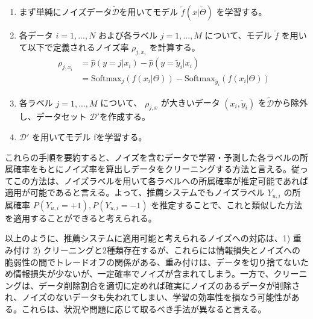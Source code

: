 \documentclass[11pt,a4paper]{article}
\begin{document}
\begin{enumerate}
    \item まず単純にノイズデータ$\tilde{\mathcal{D}}$を用いてモデル $\tilde{f}(x|\tilde{\Theta})$ を学習する。
    \item 各データ $i=1,...,N$ および各ラベル $j=1,...,M$ について、モデル $\tilde{f}$ を用いて以下で定義されるノイズ率 $\rho_{j,x_{i}}$ を計算する。
    \begin{align}
        \rho_{j,x_{i}}&=\hat{p}(y=j|x_{i})-\hat{p}(y=\tilde{y}_{i}|x_{i}) \label{eq:2.6} \\
        &= \text{Softmax}_{j}(f(x_{i}|\Theta))-\text{Softmax}_{\tilde{y}_{i}}(f(x_{i}|\Theta)) \label{eq:2.7}
    \end{align}
    \item 各ラベル $j=1,...,M$ について、 $\rho_{j,x}$ が大きいデータ $(x_{i},\tilde{y}_{i})$ を$\tilde{\mathcal{D}}$から除外し、データセット $\mathcal{D}'$を作成する。
    \item $\mathcal{D}'$ を用いてモデル fを学習する。
\end{enumerate}
これらの手順を要約すると、ノイズを含むデータで学習・予測した各ラベルの所属確率をもとにノイズ率を算出しデータをクリーニングする方法と言える。従ってこの方法は、ノイズラベルを用いて各ラベルへの所属確率が推定可能であれば適用が可能であると言える。よって、推薦システムでもノイズラベル $Y_{u,i}$ の所属確率 $P(Y_{u,i}=+1),P(Y_{u,i}=-1)$ を推定することで、これと類似した方法を適用することができると考えられる。

以上のように、推薦システムに適用可能と考えられるノイズへの対応は、1) 重み付け 2) クリーニングと2種類存在するが、これらには情報損失とノイズへの脆弱性の間でトレードオフの関係がある、重み付けは、データを切り捨てないため情報損失が少ないが、一定確率でノイズが含まれてしまう。一方で、クリーニングは、データ削除割合を適切に定めれば確実にノイズのあるデータが削除され、ノイズのないデータも失われてしまい、学習の効率性を損なう可能性がある。これらは、状況や問題に応じて取るべき手法が異なると言える。
\end{document}
